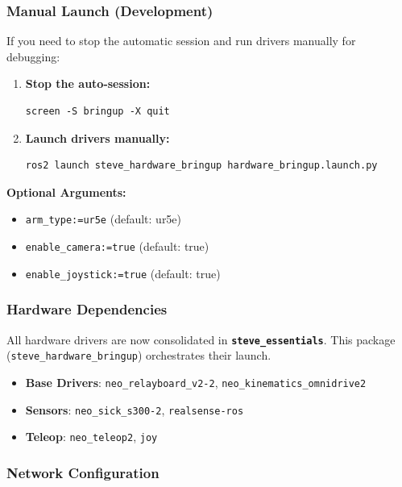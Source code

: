 \documentclass[12pt,oneside,a4paper]{article}
\begin{document}
\subsubsection{Manual Launch (Development)}

If you need to stop the automatic session and run drivers manually for debugging:

\begin{enumerate}
    \item \textbf{Stop the auto-session:}
    \begin{lstlisting}[style=bashstyle]
screen -S bringup -X quit
    \end{lstlisting}

    \item \textbf{Launch drivers manually:}
    \begin{lstlisting}[style=bashstyle]
ros2 launch steve_hardware_bringup hardware_bringup.launch.py
    \end{lstlisting}
\end{enumerate}

\textbf{Optional Arguments:}
\begin{itemize}
    \item \texttt{arm\_type:=ur5e} (default: ur5e)
    \item \texttt{enable\_camera:=true} (default: true)
    \item \texttt{enable\_joystick:=true} (default: true)
\end{itemize}

\subsubsection{Hardware Dependencies}

All hardware drivers are now consolidated in \textbf{\texttt{steve\_essentials}}. This package (\texttt{steve\_hardware\_bringup}) orchestrates their launch.

\begin{itemize}
    \item \textbf{Base Drivers}: \texttt{neo\_relayboard\_v2-2}, \texttt{neo\_kinematics\_omnidrive2}
    \item \textbf{Sensors}: \texttt{neo\_sick\_s300-2}, \texttt{realsense-ros}
    \item \textbf{Teleop}: \texttt{neo\_teleop2}, \texttt{joy}
\end{itemize}

\subsubsection{Network Configuration}
\end{document}
